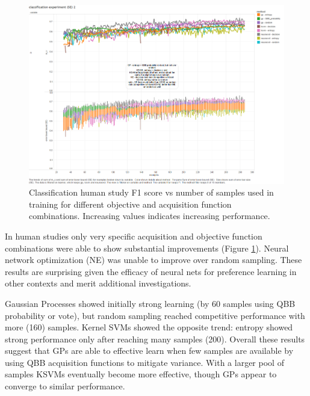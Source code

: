 \documentclass{sig-alternate}
\begin{document}
\begin{figure}[tbph]
\centering
\includegraphics[width=\linewidth]{classification_experiment}
\caption{Classification human study F1 score vs number of samples used in training for different objective and acquisition function combinations. Increasing values indicates increasing performance.}
\label{fig:cls_expr}
\end{figure}
In human studies only very specific acquisition and objective function combinations were able to show substantial improvements (Figure \ref{fig:cls_expr}).
Neural network optimization (NE) was unable to improve over random sampling.
These results are surprising given the efficacy of neural nets for preference learning in other contexts and merit additional investigations. %

Gaussian Processes showed initially strong learning (by 60 samples using QBB probability or vote), but random sampling reached competitive performance with more (160) samples.
Kernel SVMs showed the opposite trend: entropy showed strong performance only after reaching many samples (200).
Overall these results suggest that GPs are able to effective learn when few samples are available by using QBB acquisition functions to mitigate variance.
With a larger pool of samples KSVMs eventually become more effective, though GPs appear to converge to similar performance.
\end{document}
